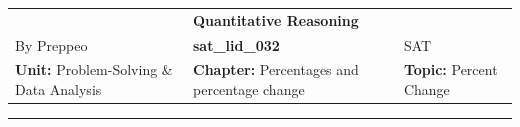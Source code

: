 \documentclass[11pt,paper=a4,answers]{exam}
\begin{document}
\begin{center}
    \centering
    \renewcommand{\arraystretch}{1.5}
    \begin{tabularx}{\textwidth}{YYY}
    & \normalsize\bf{{\Large{{Quantitative Reasoning}}}} & \\
    By Preppeo & \normalsize\bf{{sat\_lid\_032}} & SAT\\
    \normalsize{{\textbf{{Unit:}} Problem-Solving \& Data Analysis}} & \normalsize{{\textbf{{Chapter:}} Percentages and percentage change}} & \normalsize{{\textbf{{Topic:}} Percent Change}} \\
    \end{tabularx}
\end{center}
\par\noindent\rule{\textwidth}{1pt}
\end{document}
